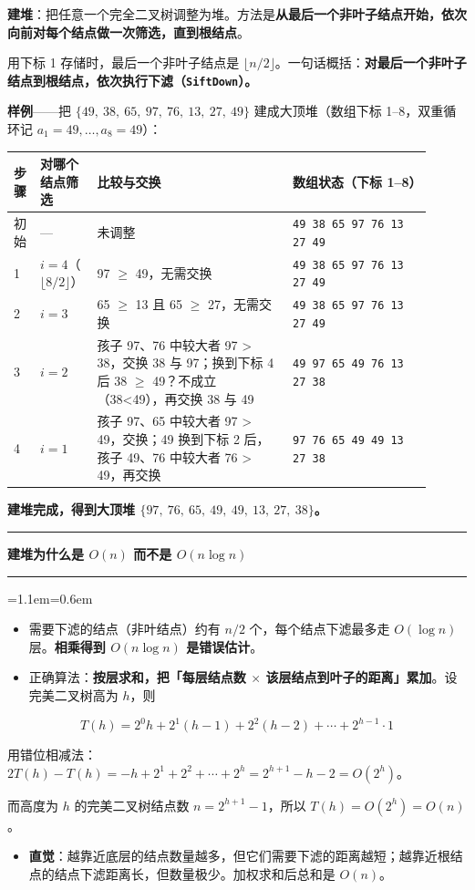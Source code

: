\documentclass[11pt,openany,UTF8]{ctexbook}
\newcommand{\callouthead}[2]{%
  \par\addvspace{7pt}\noindent
  {\color{#1}\rule[-0.15em]{3pt}{1.05em}}\hspace{0.5em}%
  {\bfseries\color{#1}#2}\par\nobreak\vspace{-0.35em}%
  {\color{rulesep}\hrule height 0.4pt}\nobreak\vspace{0.45em}%
  \begingroup\small\setlength{\parindent}{0pt}%
  \leftskip=1.1em\rightskip=0.6em\noindent\ignorespaces}
\newcommand{\calloutend}{\par\endgroup\addvspace{7pt}}
\newenvironment{callkey}[1]{\callouthead{keybar}{#1}}{\calloutend}
\begin{document}
\textbf{建堆}：把任意一个完全二叉树调整为堆。方法是\textbf{从最后一个非叶子结点开始，依次向前对每个结点做一次筛选，直到根结点}。

用下标 1 存储时，最后一个非叶子结点是 $\lfloor n/2\rfloor$。一句话概括：\textbf{对最后一个非叶子结点到根结点，依次执行下滤（\texttt{SiftDown}）。}

\textbf{样例}——把 $\{49,\ 38,\ 65,\ 97,\ 76,\ 13,\ 27,\ 49\}$ 建成大顶堆（数组下标 1–8，双重循环记 $a_1=49,\dots,a_8=49$）：

\begingroup\small\setlength{\tabcolsep}{4.0pt}
\begin{longtable}{@{}L{0.0623\linewidth}L{0.0623\linewidth}L{0.4570\linewidth}L{0.3297\linewidth}@{}}
\toprule
\textbf{步骤} & \textbf{对哪个结点筛选} & \textbf{比较与交换} & \textbf{数组状态（下标 1–8）} \\
\midrule
\endhead
初始 & — & 未调整 & \texttt{49 38 65 97 76 13 27 49} \\
1 & $i=4$（$\lfloor 8/2\rfloor$） & 97 $\ge$ 49，无需交换 & \texttt{49 38 65 97 76 13 27 49} \\
2 & $i=3$ & 65 $\ge$ 13 且 65 $\ge$ 27，无需交换 & \texttt{49 38 65 97 76 13 27 49} \\
3 & $i=2$ & 孩子 97、76 中较大者 97 > 38，交换 38 与 97；换到下标 4 后 38 $\ge$ 49？不成立（38<49），再交换 38 与 49 & \texttt{49 97 65 49 76 13 27 38} \\
4 & $i=1$ & 孩子 97、65 中较大者 97 > 49，交换；49 换到下标 2 后，孩子 49、76 中较大者 76 > 49，再交换 & \texttt{97 76 65 49 49 13 27 38} \\
\bottomrule
\end{longtable}
\endgroup

\textbf{建堆完成，得到大顶堆 $\{97,\ 76,\ 65,\ 49,\ 49,\ 13,\ 27,\ 38\}$。}

\begin{callkey}{建堆为什么是 $O(n)$ 而不是 $O(n\log n)$}
\begin{itemize}
\item 需要下滤的结点（非叶结点）约有 $n/2$ 个，每个结点下滤最多走 $O(\log n)$ 层。\textbf{相乘得到 $O(n\log n)$ 是错误估计}。
\item 正确算法：\textbf{按层求和，把「每层结点数 $\times$ 该层结点到叶子的距离」累加}。设完美二叉树高为 $h$，则
\end{itemize}
\[T(h)=2^0h+2^1(h-1)+2^2(h-2)+\cdots+2^{h-1}\cdot 1\]

用错位相减法：$2T(h)-T(h)=-h+2^1+2^2+\cdots+2^h=2^{h+1}-h-2=O(2^h)$。

而高度为 $h$ 的完美二叉树结点数 $n=2^{h+1}-1$，所以 $T(h)=O(2^h)=O(n)$。

\begin{itemize}
\item \textbf{直觉}：越靠近底层的结点数量越多，但它们需要下滤的距离越短；越靠近根结点的结点下滤距离长，但数量极少。加权求和后总和是 $O(n)$。
\end{itemize}
\end{callkey}
\end{document}
